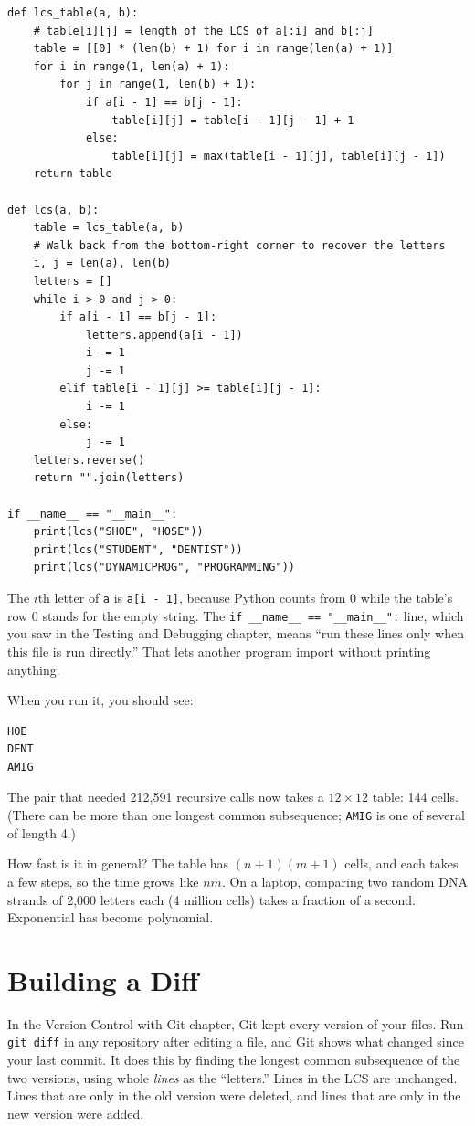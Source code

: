 \begin{verbatim}
def lcs_table(a, b):
    # table[i][j] = length of the LCS of a[:i] and b[:j]
    table = [[0] * (len(b) + 1) for i in range(len(a) + 1)]
    for i in range(1, len(a) + 1):
        for j in range(1, len(b) + 1):
            if a[i - 1] == b[j - 1]:
                table[i][j] = table[i - 1][j - 1] + 1
            else:
                table[i][j] = max(table[i - 1][j], table[i][j - 1])
    return table

def lcs(a, b):
    table = lcs_table(a, b)
    # Walk back from the bottom-right corner to recover the letters
    i, j = len(a), len(b)
    letters = []
    while i > 0 and j > 0:
        if a[i - 1] == b[j - 1]:
            letters.append(a[i - 1])
            i -= 1
            j -= 1
        elif table[i - 1][j] >= table[i][j - 1]:
            i -= 1
        else:
            j -= 1
    letters.reverse()
    return "".join(letters)

if __name__ == "__main__":
    print(lcs("SHOE", "HOSE"))
    print(lcs("STUDENT", "DENTIST"))
    print(lcs("DYNAMICPROG", "PROGRAMMING"))
\end{verbatim}

The $i$th letter of \verb|a| is \verb|a[i - 1]|, because Python counts from 0 while the table's row 0 stands
for the empty string. The \verb|if __name__ == "__main__":| line, which you saw in the Testing and Debugging
chapter, means ``run these lines only when this file is run directly.'' That lets another program import
 without printing anything.

When you run it, you should see:
\begin{verbatim}
HOE
DENT
AMIG
\end{verbatim}

The pair that needed 212,591 recursive calls now takes a $12 \times 12$ table: 144 cells. (There can be more
than one longest common subsequence; \verb|AMIG| is one of several of length 4.)

How fast is it in general? The table has $(n + 1)(m + 1)$ cells, and each takes a few steps, so the time
grows like $nm$. On a laptop, comparing two random DNA strands of 2,000 letters each (4 million cells) takes
a fraction of a second. Exponential has become polynomial.

\section{Building a Diff}
In the Version Control with Git chapter, Git kept every version of your files. Run \verb|git diff| in any
repository after editing a file, and Git shows what changed since your last commit. It does this by finding the longest common subsequence of the two versions, using whole \emph{lines} as the
``letters.'' Lines in the LCS are unchanged. Lines that are only in the old version were deleted, and lines
that are only in the new version were added.

